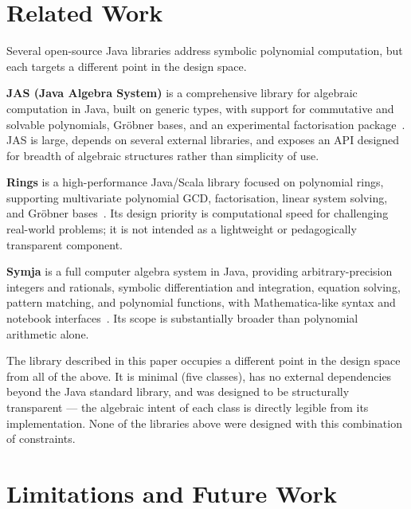 \documentclass[11pt,a4paper]{article}
\begin{document}
\section{Related Work}

Several open-source Java libraries address symbolic polynomial computation,
but each targets a different point in the design space.

\textbf{JAS (Java Algebra System)} is a comprehensive library for algebraic
computation in Java, built on generic types, with support for commutative and
solvable polynomials, Gr\"{o}bner bases, and an experimental factorisation
package~\cite{kredel2008}.
JAS is large, depends on several external libraries, and exposes an API
designed for breadth of algebraic structures rather than simplicity of use.

\textbf{Rings} is a high-performance Java/Scala library focused on polynomial
rings, supporting multivariate polynomial GCD, factorisation, linear system
solving, and Gr\"{o}bner bases~\cite{poslavsky2019}.
Its design priority is computational speed for challenging real-world problems;
it is not intended as a lightweight or pedagogically transparent component.

\textbf{Symja} is a full computer algebra system in Java, providing
arbitrary-precision integers and rationals, symbolic differentiation and
integration, equation solving, pattern matching, and polynomial functions,
with Mathematica-like syntax and notebook interfaces~\cite{kramer2023}.
Its scope is substantially broader than polynomial arithmetic alone.

The library described in this paper occupies a different point in the design
space from all of the above.
It is minimal (five classes), has no external dependencies beyond the Java
standard library, and was designed to be structurally transparent --- the
algebraic intent of each class is directly legible from its implementation.
None of the libraries above were designed with this combination of constraints.

\section{Limitations and Future Work}
\end{document}
